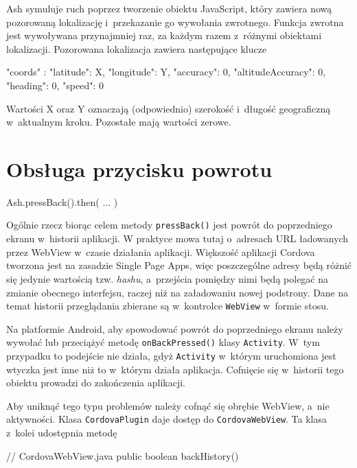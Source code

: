 \documentclass{xmgr}
\begin{document}
Ash symuluje ruch poprzez tworzenie obiektu JavaScript, który zawiera nową pozorowaną lokalizację i~przekazanie go wywołania zwrotnego. Funkcja zwrotna jest wywoływana przynajmniej raz, za każdym razem z~różnymi obiektami lokalizacji. Pozorowana lokalizacja zawiera następujące klucze

\begin{javascriptcode}

{
  "coords" :  {
      "latitude": X, 
      "longitude": Y,
      "accuracy": 0, 
      "altitudeAccuracy": 0, 
      "heading": 0, 
      "speed": 0
   }
}

\end{javascriptcode}

Wartości X oraz Y oznaczają (odpowiednio) szerokość i~długość geograficzną w~aktualnym kroku. Pozostałe mają wartości zerowe.   

\section{Obsługa przycisku powrotu}

\begin{javascriptcode}
   Ash.pressBack().then( ... ) 
\end{javascriptcode}

Ogólnie rzecz biorąc celem metody \texttt{pressBack()} jest powrót do poprzedniego ekranu w~historii aplikacji. W praktyce mowa tutaj o~adresach URL ładowanych przez WebView w~czasie działania aplikacji. Większość aplikacji Cordova tworzona jest na zasadzie Single Page Apps, więc poszczególne adresy będą różnić się jedynie wartością tzw. \textit{hashu}, a~przejścia pomiędzy nimi będą polegać na zmianie obecnego interfejsu, raczej niż na załadowaniu nowej podstrony. Dane na temat historii przeglądania zbierane są w~kontrolce \texttt{WebView} w~formie stosu.

Na platformie Android, aby spowodować powrót do poprzedniego ekranu należy wywołać lub przeciążyć metodę \texttt{onBackPressed()} klasy \texttt{Activity}. W~tym przypadku to podejście nie działa, gdyż \texttt{Activity} w~którym uruchomiona jest wtyczka jest inne niż to w~którym działa aplikacja. Cofnięcie się w~historii tego obiektu prowadzi do zakończenia aplikacji. 

Aby uniknąć tego typu problemów należy cofnąć się obrębie WebView, a~nie aktywności. Klasa \texttt{CordovaPlugin} daje dostęp do \texttt{CordovaWebView}. Ta klasa z~kolei udostępnia metodę 

\begin{javacode}
    // CordovaWebView.java
    public boolean backHistory()
\end{javacode}
\end{document}
